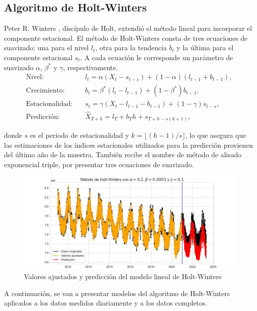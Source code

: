\documentclass[12pt,twoside]{article}
\begin{document}
\newpage
\subsection{Algoritmo de Holt-Winters}
Peter R. Winters \cite{ES3}, discípulo de Holt, extendió el método lineal para incorporar el componente estacional. El método de Holt-Winters consta de tres ecuaciones de suavizado: una para el nivel $l_t$, otra para la tendencia $b_t$ y la última para el componente estacional $s_t$. A cada ecuación le corresponde un parámetro de suavizado $\alpha$, $\beta^*$ y $\gamma$, respectivamente. 
\begin{align*}
    \text{Nivel:} \quad& l_t = \alpha(X_t - s_{t-s}) + (1-\alpha)(l_{t-1} + b_{t-1}),\\
    \text{Crecimiento:} \quad& b_t = \beta^*(l_t - l_{t-1}) + (1-\beta^*)b_{t-1},\\
    \text{Estacionalidad:} \quad& s_t = \gamma (X_t  - l_{t-1} - b_{t-1}) + (1-\gamma)s_{t-s},\\
    \text{Predicción:} \quad& \hat{X}_{T+h} = l_T + b_Th + s_{T+h-s(k+1)},
\end{align*}

donde $s$ es el periodo de estacionalidad y  $k = \lfloor (h-1)/s \rfloor$, lo que asegura que las estimaciones de los índices estacionales utilizados para la predicción provienen del último año de la muestra. También recibe el nombre de método de alisado exponencial triple, por presentar tres ecuaciones de suavizado.

\begin{figure}[h]
    \centering
    \includegraphics[width = \textwidth]{imagenes/HoltWinters1.jpg}
    \caption{Valores ajustados y predicción del modelo lineal de Holt-Winters}\label{fig:HoltWinters1}
\end{figure}

A continuación, se van a presentar modelos del algoritmo de Holt-Winters aplicados a los datos medidos diariamente y a los datos completos. 
\end{document}
